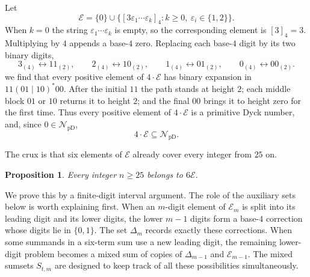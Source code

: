 \documentclass[12pt]{article}
\theoremstyle{plain}
\newtheorem{proposition}[theorem]{Proposition}
\theoremstyle{definition}
\theoremstyle{plain}
\newcommand{\val}[2]{[#1]_{#2}}
\newcommand{\NpD}{\mathcal{N}_{\mathrm{pD}}}
\begin{document}
Let
\[
 \mathcal E=\{0\}\cup
 \bigl\{\val{3\varepsilon_1\cdots\varepsilon_k}{4}:
        k\geq0,\ \varepsilon_i\in\{1,2\}\bigr\}.
\]
When $k=0$ the string $\varepsilon_1\cdots\varepsilon_k$ is empty, so
the corresponding element is $\val{3}{4}=3$.  Multiplying by $4$ appends
a base-$4$ zero.  Replacing each base-$4$ digit by its two binary digits,
\[
 3_{(4)}\longleftrightarrow11_{(2)},\qquad
 2_{(4)}\longleftrightarrow10_{(2)},\qquad
 1_{(4)}\longleftrightarrow01_{(2)},\qquad
 0_{(4)}\longleftrightarrow00_{(2)}.
\]
we find that every positive element of $4\cdot\mathcal E$ has binary
expansion in $11(01\mid10)^*00$.  After the initial $11$ the path stands
at height $2$; each middle block $01$ or $10$ returns it to height $2$;
and the final $00$ brings it to height zero for the first time.  Thus
every positive element of $4\cdot\mathcal E$ is a primitive Dyck number,
and, since $0\in\NpD$,
\begin{equation}\label{eq:4E}
        4\cdot\mathcal E\subseteq\NpD.
\end{equation}

The crux is that six elements of $\mathcal E$ already cover every integer
from $25$ on.

\begin{proposition}\label{prop:E}
Every integer $n\geq25$ belongs to $6\mathcal E$.
\end{proposition}

We prove this by a finite-digit interval argument.  The role of the
auxiliary sets below is worth explaining first.  When an $m$-digit element
of $\mathcal E_{m}$ is split into its leading digit and its lower digits, the
lower $m-1$ digits form a base-$4$ correction whose digits lie in
$\{0,1\}$.  The set $\Delta_m$ records exactly these corrections.  When
some summands in a six-term sum use a new leading digit, the remaining
lower-digit problem becomes a mixed sum of copies of $\Delta_{m-1}$ and
$\mathcal E_{m-1}$.  The mixed sumsets $S_{t,m}$ are designed to keep
track of all these possibilities simultaneously.
\end{document}
